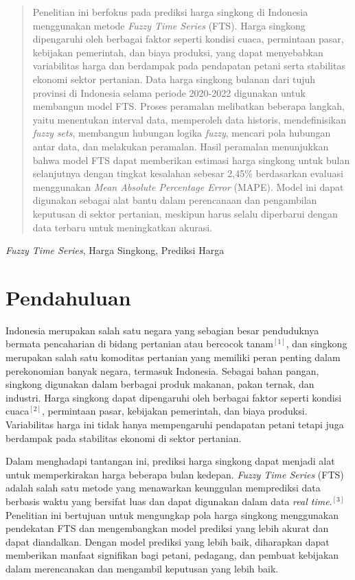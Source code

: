 \documentclass[conference]{IEEEtran}
\renewcommand{\headrulewidth}{0pt}
\renewcommand{\footrulewidth}{0.4pt}
\begin{document}
\begin{abstract}
    Penelitian ini berfokus pada prediksi harga singkong di Indonesia menggunakan metode \textit{Fuzzy Time Series} (FTS). Harga singkong dipengaruhi oleh berbagai faktor seperti kondisi cuaca, permintaan pasar, kebijakan pemerintah, dan biaya produksi, yang dapat menyebabkan variabilitas harga dan berdampak pada pendapatan petani serta stabilitas ekonomi sektor pertanian. Data harga singkong bulanan dari tujuh provinsi di Indonesia selama periode 2020-2022 digunakan untuk membangun model FTS. Proses peramalan melibatkan beberapa langkah, yaitu menentukan interval data, memperoleh data historis, mendefinisikan \textit{fuzzy sets}, membangun hubungan logika \textit{fuzzy}, mencari pola hubungan antar data, dan melakukan peramalan. Hasil peramalan menunjukkan bahwa model FTS dapat memberikan estimasi harga singkong untuk bulan selanjutnya dengan tingkat kesalahan sebesar 2,45\% berdasarkan evaluasi menggunakan \textit{Mean Absolute Percentage Error} (MAPE). Model ini dapat digunakan sebagai alat bantu dalam perencanaan dan pengambilan keputusan di sektor pertanian, meskipun harus selalu diperbarui dengan data terbaru untuk meningkatkan akurasi.
\end{abstract}

\begin{IEEEkeywords}
\textit{Fuzzy Time Series}, Harga Singkong, Prediksi Harga
\end{IEEEkeywords}

\thispagestyle{fancy}
\fancyhf{}
\fancyfoot[C]{\thepage}
\renewcommand{\headrulewidth}{0pt}
\renewcommand{\footrulewidth}{0.4pt}
\section{Pendahuluan}
Indonesia merupakan salah satu negara yang sebagian besar penduduknya bermata pencaharian di bidang pertanian atau bercocok tanam$^{[1]}$, dan singkong merupakan salah satu komoditas pertanian yang memiliki peran penting dalam perekonomian banyak negara, termasuk Indonesia. Sebagai bahan pangan, singkong digunakan dalam berbagai produk makanan, pakan ternak, dan industri.  Harga singkong dapat dipengaruhi oleh berbagai faktor seperti kondisi cuaca$^{[2]}$, permintaan pasar, kebijakan pemerintah, dan biaya produksi. Variabilitas harga ini tidak hanya mempengaruhi pendapatan petani tetapi juga berdampak pada stabilitas ekonomi di sektor pertanian.

Dalam menghadapi tantangan ini, prediksi harga singkong dapat menjadi alat untuk memperkirakan harga beberapa bulan kedepan. \textit{Fuzzy Time Series} (FTS) adalah salah satu metode yang menawarkan keunggulan memprediksi data berbasis waktu yang bersifat luas dan dapat digunakan dalam data \textit{real time}.$^{[3]}$ Penelitian ini bertujuan untuk mengungkap pola harga singkong menggunakan pendekatan FTS dan mengembangkan model prediksi yang lebih akurat dan dapat diandalkan. Dengan model prediksi yang lebih baik, diharapkan dapat memberikan manfaat signifikan bagi petani, pedagang, dan pembuat kebijakan dalam merencanakan dan mengambil keputusan yang lebih baik.
\end{document}
